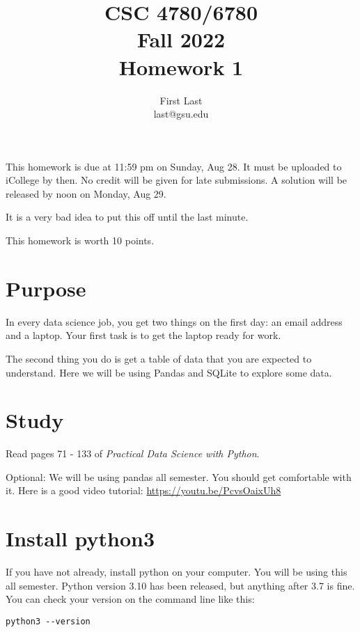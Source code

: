 \documentclass[11pt,english]{article}
\begin{document}
\title{CSC 4780/6780 \\
Fall 2022\\ Homework 1}
\author{First Last \\ last@gsu.edu}
\maketitle

This homework is due at 11:59 pm on Sunday, Aug 28.  It must be uploaded to iCollege by then.  No credit will be given for late submissions.  A solution will be released by noon on Monday,  Aug 29.

It is a very bad idea to put this off until the last minute.

This homework is worth 10 points.

\section{Purpose}

In every data science job,  you get two things on the first day: an email address and a laptop.  Your first task is to get the laptop ready for work.

The second thing you do is get a table of data that you are expected to understand.  Here we will be using Pandas and SQLite to explore some data.

\section{Study}

Read pages 71 -  133 of \textit{Practical Data Science with Python}.

Optional: We will be using pandas all semester. You should get comfortable with it.  Here is a good video tutorial: 
\url{https://youtu.be/PcvsOaixUh8}

\section{Install python3}

If you have not already,  install python on your computer.  You will be using this all semester.   
Python version 3.10 has been released,  but anything after 3.7 is fine.  You can check your version 
on the command line like this: 

\begin{Verbatim}
python3 --version
\end{Verbatim}
\end{document}
